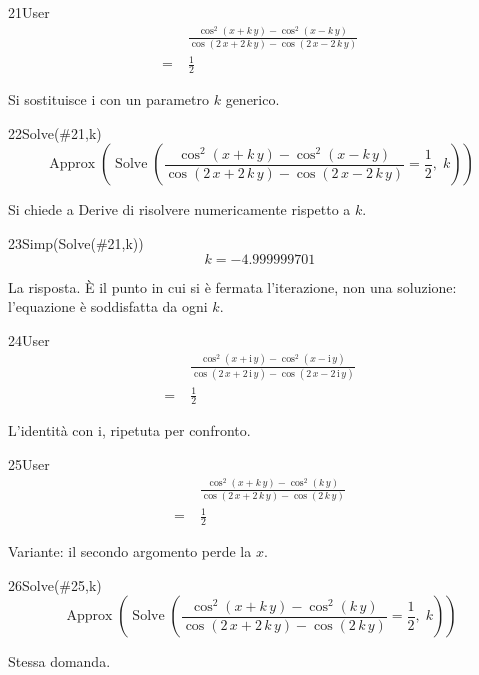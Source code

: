\begin{espr}{21}{User}{\verificata}
\begin{align*}
& \frac{\cos^{2}\!\left(x + k\, y\right) - \cos^{2}\!\left(x - k\, y\right)}{\cos\!\left(2\, x + 2\, k\, y\right) - \cos\!\left(2\, x - 2\, k\, y\right)} \\
=\;& \frac{1}{2}
\end{align*}
\end{espr}
Si sostituisce $\mathrm{i}$ con un parametro $k$ generico.

\begin{espr}{22}{Solve(\#21,k)}{}
\[
\operatorname{Approx}\!\left(\operatorname{Solve}\!\left(\frac{\cos^{2}\!\left(x + k\, y\right) - \cos^{2}\!\left(x - k\, y\right)}{\cos\!\left(2\, x + 2\, k\, y\right) - \cos\!\left(2\, x - 2\, k\, y\right)} = \frac{1}{2},\; k\right)\right)
\]
\end{espr}
Si chiede a Derive di risolvere numericamente rispetto a $k$.

\begin{espr}{23}{Simp(Solve(\#21,k))}{}
\[
k = -4.999999701
\]
\end{espr}
La risposta. È il punto in cui si è fermata l'iterazione, non una soluzione: l'equazione è soddisfatta da ogni $k$.

\begin{espr}{24}{User}{\verificata}
\begin{align*}
& \frac{\cos^{2}\!\left(x + \mathrm{i}\, y\right) - \cos^{2}\!\left(x - \mathrm{i}\, y\right)}{\cos\!\left(2\, x + 2\, \mathrm{i}\, y\right) - \cos\!\left(2\, x - 2\, \mathrm{i}\, y\right)} \\
=\;& \frac{1}{2}
\end{align*}
\end{espr}
L'identità con $\mathrm{i}$, ripetuta per confronto.

\begin{espr}{25}{User}{\verificata}
\begin{align*}
& \frac{\cos^{2}\!\left(x + k\, y\right) - \cos^{2}\!\left(k\, y\right)}{\cos\!\left(2\, x + 2\, k\, y\right) - \cos\!\left(2\, k\, y\right)} \\
=\;& \frac{1}{2}
\end{align*}
\end{espr}
Variante: il secondo argomento perde la $x$.

\begin{espr}{26}{Solve(\#25,k)}{}
\[
\operatorname{Approx}\!\left(\operatorname{Solve}\!\left(\frac{\cos^{2}\!\left(x + k\, y\right) - \cos^{2}\!\left(k\, y\right)}{\cos\!\left(2\, x + 2\, k\, y\right) - \cos\!\left(2\, k\, y\right)} = \frac{1}{2},\; k\right)\right)
\]
\end{espr}
Stessa domanda.

